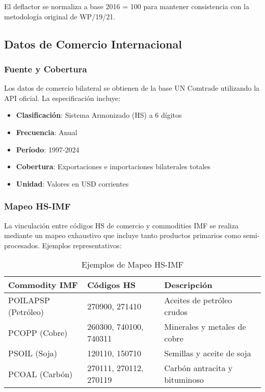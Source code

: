 \documentclass[12pt,a4paper]{article}
\begin{document}
El deflactor se normaliza a base 2016 = 100 para mantener consistencia con la metodología original de WP/19/21.

\subsection{Datos de Comercio Internacional}

\subsubsection{Fuente y Cobertura}
Los datos de comercio bilateral se obtienen de la base UN Comtrade utilizando la API oficial. La especificación incluye:

\begin{itemize}
    \item \textbf{Clasificación}: Sistema Armonizado (HS) a 6 dígitos
    \item \textbf{Frecuencia}: Anual
    \item \textbf{Período}: 1997-2024
    \item \textbf{Cobertura}: Exportaciones e importaciones bilaterales totales
    \item \textbf{Unidad}: Valores en USD corrientes
\end{itemize}

\subsubsection{Mapeo HS-IMF}
La vinculación entre códigos HS de comercio y commodities IMF se realiza mediante un mapeo exhaustivo que incluye tanto productos primarios como semi-procesados. Ejemplos representativos:

\begin{table}[H]
\centering
\caption{Ejemplos de Mapeo HS-IMF}
\begin{tabular}{lll}
\toprule
\textbf{Commodity IMF} & \textbf{Códigos HS} & \textbf{Descripción} \\
\midrule
POILAPSP (Petróleo) & 270900, 271410 & Aceites de petróleo crudos \\
PCOPP (Cobre) & 260300, 740100, 740311 & Minerales y metales de cobre \\
PSOIL (Soja) & 120110, 150710 & Semillas y aceite de soja \\
PCOAL (Carbón) & 270111, 270112, 270119 & Carbón antracita y bituminoso \\
\bottomrule
\end{tabular}
\label{tab:hs_mapping}
\end{table}
\end{document}
